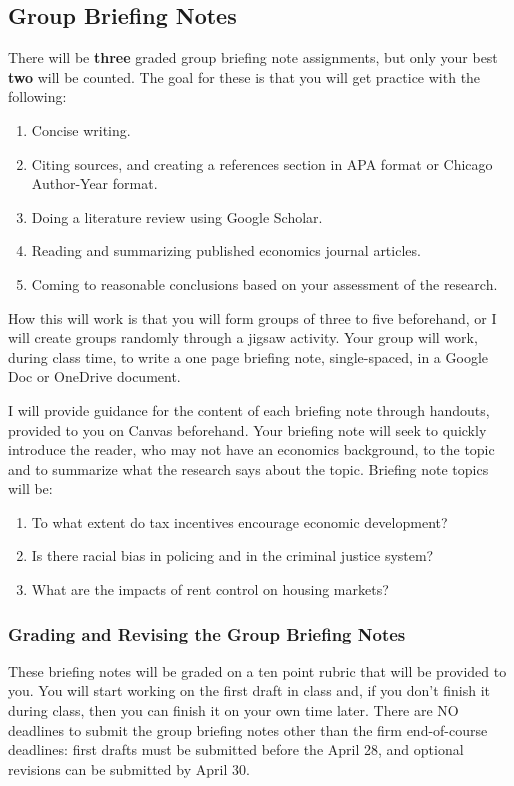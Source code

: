 \documentclass[11pt,letterpaper,final]{article}
\begin{document}
\subsection{Group Briefing Notes}
There will be \textbf{three} graded group briefing note assignments, but only your best \textbf{two} will be counted. The goal for these is that you will get practice with the following:
\begin{enumerate}
\item Concise writing.
\item Citing sources, and creating a references section in APA format or Chicago Author-Year format.
\item Doing a literature review using Google Scholar.
\item Reading and summarizing published economics journal articles.
\item Coming to reasonable conclusions based on your assessment of the research.
\end{enumerate}
How this will work is that you will form groups of three to five beforehand, or I will create groups randomly through a jigsaw activity. Your group will work, during class time, to write a one page briefing note, single-spaced, in a Google Doc or OneDrive document.

I will provide guidance for the content of each briefing note through handouts, provided to you on Canvas beforehand. Your briefing note will seek to quickly introduce the reader, who may not have an economics background, to the topic and to summarize what the research says about the topic. Briefing note topics will be:

\begin{enumerate}
\item To what extent do tax incentives encourage economic development?
\item Is there racial bias in policing and in the criminal justice system?
\item What are the impacts of rent control on housing markets?
\end{enumerate}

\subsubsection{Grading and Revising the Group Briefing Notes}
These briefing notes will be graded on a ten point rubric that will be provided to you. You will start working on the first draft in class and, if you don't finish it during class, then you can finish it on your own time later. There are NO deadlines to submit the group briefing notes other than the firm end-of-course deadlines: first drafts must be submitted before the April 28, and optional revisions can be submitted by April 30.
\end{document}
